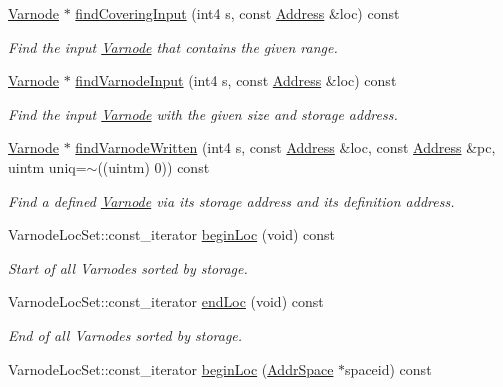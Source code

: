 \begin{DoxyCompactItemize}
\mbox{\hyperlink{class_varnode}{Varnode}} $\ast$ \mbox{\hyperlink{class_funcdata_a6461d0bee74dda24aafa2caa40d0fee7}{find\+Covering\+Input}} (int4 s, const \mbox{\hyperlink{class_address}{Address}} \&loc) const
\begin{DoxyCompactList}\small\item\em Find the input \mbox{\hyperlink{class_varnode}{Varnode}} that contains the given range. \end{DoxyCompactList}\item 
\mbox{\hyperlink{class_varnode}{Varnode}} $\ast$ \mbox{\hyperlink{class_funcdata_a718cc133e6ade757ee532f0d704c04d4}{find\+Varnode\+Input}} (int4 s, const \mbox{\hyperlink{class_address}{Address}} \&loc) const
\begin{DoxyCompactList}\small\item\em Find the input \mbox{\hyperlink{class_varnode}{Varnode}} with the given size and storage address. \end{DoxyCompactList}\item 
\mbox{\hyperlink{class_varnode}{Varnode}} $\ast$ \mbox{\hyperlink{class_funcdata_acb7ae831db646e2f9d64ffb2b51fa7f1}{find\+Varnode\+Written}} (int4 s, const \mbox{\hyperlink{class_address}{Address}} \&loc, const \mbox{\hyperlink{class_address}{Address}} \&pc, uintm uniq=$\sim$((uintm) 0)) const
\begin{DoxyCompactList}\small\item\em Find a defined \mbox{\hyperlink{class_varnode}{Varnode}} via its storage address and its definition address. \end{DoxyCompactList}\item 
Varnode\+Loc\+Set\+::const\+\_\+iterator \mbox{\hyperlink{class_funcdata_ac34a257742ad827bd278d0b35e15af74}{begin\+Loc}} (void) const
\begin{DoxyCompactList}\small\item\em Start of all Varnodes sorted by storage. \end{DoxyCompactList}\item 
Varnode\+Loc\+Set\+::const\+\_\+iterator \mbox{\hyperlink{class_funcdata_a49f4e57094c47d431d81545f28172c1f}{end\+Loc}} (void) const
\begin{DoxyCompactList}\small\item\em End of all Varnodes sorted by storage. \end{DoxyCompactList}\item 
Varnode\+Loc\+Set\+::const\+\_\+iterator \mbox{\hyperlink{class_funcdata_a6d8fa3ac2bdccfd83dd3eba870ef3b09}{begin\+Loc}} (\mbox{\hyperlink{class_addr_space}{Addr\+Space}} $\ast$spaceid) const

\end{DoxyCompactItemize}
